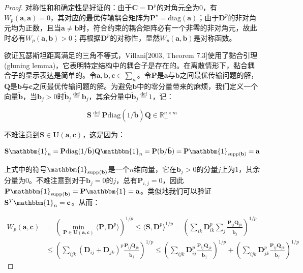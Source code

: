 \documentclass[cn,10pt,math=newtx,citestyle=gb7714-2015,bibstyle=gb7714-2015]{elegantbook}
\begin{document}
\begin{proof}
对称性和和确定性是好证的：由于$\mathbf{C}=\mathbf{D}^p$的对角元全为$0$，有$W_p(\mathbf{a,a})=0$，其对应的最优传输耦合矩阵为$\mathbf{P}^\star=\text{diag}(\mathbf{a})$；由于$\mathbf{D}^p$的非对角元均为正数，且当$\mathbf{a}\neq \mathbf{b}$时，符合约束的耦合矩阵必有一个非零的非对角元，故此时必有$W_p(\mathbf{a,b})>0$；再根据$\mathbf{D}^p$的对称性，显然$W_p(\mathbf{a,b})$是对称函数。

欲证瓦瑟斯坦距离满足的三角不等式，Villani[2003, Theorem 7.3]使用了黏合引理(gluning lemma)，它表明特定结构中的耦合子是存在的。在离散情形下，黏合耦合子的显示表达是简单的。令$\mathbf{a,b,c}\in\sum_n$。令$\mathbf{P}$是$\mathbf{a}$与$\mathbf{b}$之间最优传输问题的解，$\mathbf{Q}$是$\mathbf{b}$与$\mathbf{c}$之间最优传输问题的解。为避免$\mathbf{b}$中的零分量带来的麻烦，我们定义一个向量$\tilde{\mathbf{b}}$，当$\mathbf{b}_j>0$时$\tilde{\mathbf{b}}_j\overset{\text{def}}{=}\mathbf{b}_j$，其余分量中$\tilde{\mathbf{b}}_j\overset{\text{def}}{=}1$，记：

\begin{equation*}
    \mathbf{S}\overset{\text{def}}{=}\mathbf{P}\text{diag}(1/\tilde{\mathbf{b}})\mathbf{Q}\in\mathbb{R}_+^{n\times m}
\end{equation*}

不难注意到$\mathbf{S}\in\mathbf{U}(\mathbf{a,c})$，这是因为：

\begin{equation*}
    \mathbf{S}\mathbbm{1}_n=\mathbf{P}\text{diag}(1/\tilde{\mathbf{b}})\mathbf{Q}\mathbbm{1}_n=\mathbf{P}(\mathbf{b}/\tilde{\mathbf{b}})=\mathbf{P}\mathbbm{1}_{\text{supp}(\mathbf{b})}=\mathbf{a}
\end{equation*}

上式中的符号$\mathbbm{1}_{\text{supp}(\mathbf{b})}$是一个$n$维向量，它在$\mathbf{b}_j>0$的分量$j$上为$1$，其余分量为0。不难注意到对于$\mathbf{b}_j=0$的$j$，总有$\mathbf{P}_{i,j}=0$，因此$\mathbf{P}\mathbbm{1}_{\text{supp}(\mathbf{b})}=\mathbf{P}\mathbbm{1}=\mathbf{a}$。类似地我们可以验证$\mathbf{S}^T\mathbbm{1}_n=\mathbf{c}$。从而：

\begin{align*}
    W_p(\mathbf{a,c}) &= \left( \min\limits_{\mathbf{P}\in \mathbf{U(a,c)}}\langle \mathbf{P},\mathbf{D}^p \rangle \right)^{1/p}\leq \langle \mathbf{S},\mathbf{D}^p \rangle ^{1/p} = \left( \sum_{ik}\mathbf{D}_{ik}^p\sum_j \frac{\mathbf{P}_{ij}\mathbf{Q}_{jk}}{\tilde{\mathbf{b}}_j} \right)^{1/p} \\
    &\leq \left( \sum_{ijk}(\mathbf{D}_{ij}+\mathbf{D}_{jk})^p \frac{\mathbf{P}_{ij}\mathbf{Q}_{jk}}{\tilde{\mathbf{b}}_j} \right)^{1/p} \leq \left(\sum_{ijk}\mathbf{D}_{ij}^p \frac{\mathbf{P}_{ij}\mathbf{Q}_{jk}}{\tilde{\mathbf{b}}_j}\right)^{1/p}+\left(\sum_{ijk}\mathbf{D}_{jk}^p \frac{\mathbf{P}_{ij}\mathbf{Q}_{jk}}{\tilde{\mathbf{b}}_j}\right)^{1/p} 
\end{align*}


\end{proof}
\end{document}

